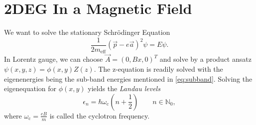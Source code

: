 \section{2DEG In a Magnetic Field}
We want to solve the stationary Schrödinger Equation
\begin{equation*}
	\frac{1}{2m_\text{eff}}\left(\vec{p}-e\vec{a}\right)^2\psi = E\psi.
\end{equation*}
In Lorentz gauge, we can choose $\vec{A}=(0, Bx, 0)^T$ and solve by a product ansatz $\psi(x,y,z) = \phi(x,y)Z(z)$.
The z-equation is readily solved with the eigenenergies being the sub-band energies mentioned in \autoref{eq:subband}.
Solving the eigenequation for $\phi(x,y)$ yields the \textit{Landau levels}
\begin{equation*}
	\epsilon_n = \hbar\omega_\text{c}\left(n+\frac{1}{2}\right)\qquad{n\in\mathbb{N}_0},
\end{equation*}
where $\omega_\text{c} = \frac{eB}{m}$ is called the cyclotron frequency.
